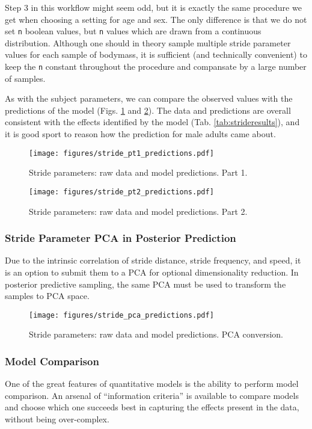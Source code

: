 Step 3 in this workflow might seem odd, but it is exactly the same procedure we get when choosing a setting for age and sex.
The only difference is that we do not set \texttt{n} boolean values, but \texttt{n} values which are drawn from a continuous distribution.
Although one should in theory sample multiple stride parameter values for each sample of bodymass, it is sufficient (and technically convenient) to keep the \texttt{n} constant throughout the procedure and compansate by a large number of samples.


As with the subject parameters, we can compare the observed values with the predictions of the model (Figs. \ref{fig:stride1} and \ref{fig:stride2}).
The data and predictions are overall consistent with the effects identified by the model (Tab. \ref{tab:strideresults}), and it is good sport to reason how the prediction for male adults came about.


\begin{figure}[p]
\centering
\texttt{[image: figures/stride\_pt1\_predictions.pdf]}
\caption{\label{fig:stride1}Stride parameters: raw data and model predictions. Part 1.}
\end{figure}

\begin{figure}[p]
\centering
\texttt{[image: figures/stride\_pt2\_predictions.pdf]}
\caption{\label{fig:stride2}Stride parameters: raw data and model predictions. Part 2.}
\end{figure}



\subsubsection{Stride Parameter PCA in Posterior Prediction}
\label{sec:org82b0840}
Due to the intrinsic correlation of stride distance, stride frequency, and speed, it is an option to submit them to a PCA for optional dimensionality reduction.
In posterior predictive sampling, the same PCA must be used to transform the samples to PCA space.

\begin{figure}[p]
\centering
\texttt{[image: figures/stride\_pca\_predictions.pdf]}
\caption{\label{fig:stridepca}Stride parameters: raw data and model predictions. PCA conversion.}
\end{figure}



\subsubsection{Model Comparison}
\label{strides:comparison}
One of the great features of quantitative models is the ability to perform model comparison.
An arsenal of ``information criteria'' is available to compare models and choose which one succeeds best in capturing the effects present in the data, without being over-complex.

